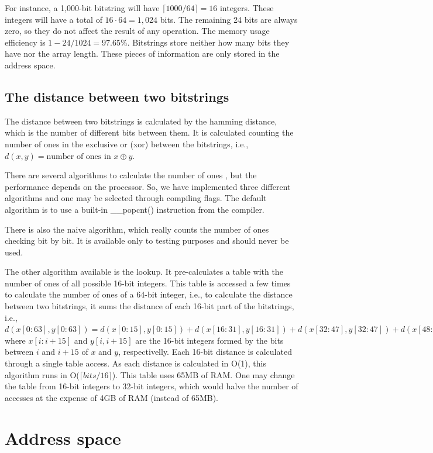 For instance, a 1,000-bit bitstring will have $\lceil 1000/64 \rceil = 16$ integers. These integers will have a total of $16 \cdot 64 = 1,024$ bits. The remaining 24 bits are always zero, so they do not affect the result of any operation. The memory usage efficiency is $1 - 24/1024 = 97.65\%$. Bitstrings store neither how many bits they have nor the array length. These pieces of information are only stored in the address space.


\subsection{The distance between two bitstrings}

The distance between two bitstrings is calculated by the hamming distance, which is the number of different bits between them. It is calculated counting the number of ones in the exclusive or (xor) between the bitstrings, i.e., $d(x, y) = \text{number of ones in } x \oplus y$.

There are several algorithms to calculate the number of ones \citep{warren2013hacker}, but the performance depends on the processor. So, we have implemented three different algorithms and one may be selected through compiling flags. The default algorithm is to use a built-in \_\_popcnt() instruction from the compiler.

There is also the naive algorithm, which really counts the number of ones checking bit by bit. It is available only to testing purposes and should never be used.

The other algorithm available is the lookup. It pre-calculates a table with the number of ones of all possible 16-bit integers. This table is accessed a few times to calculate the number of ones of a 64-bit integer, i.e., to calculate the distance between two bitstrings, it sums the distance of each 16-bit part of the bitstrings, i.e., $d(x[0:63], y[0:63]) = d(x[0:15], y[0:15]) + d(x[16:31], y[16:31]) + d(x[32:47], y[32:47]) + d(x[48:63], y[48:63])$ where $x[i:i+15]$ and $y[i, i+15]$ are the 16-bit integers formed by the bits between $i$ and $i+15$ of $x$ and $y$, respectivelly. Each 16-bit distance is calculated through a single table access. As each distance is calculated in O(1), this algorithm runs in O($\lceil bits/16 \rceil$). This table uses 65MB of RAM. One may change the table from 16-bit integers to 32-bit integers, which would halve the number of accesses at the expense of 4GB of RAM (instead of 65MB).


\section{Address space}

